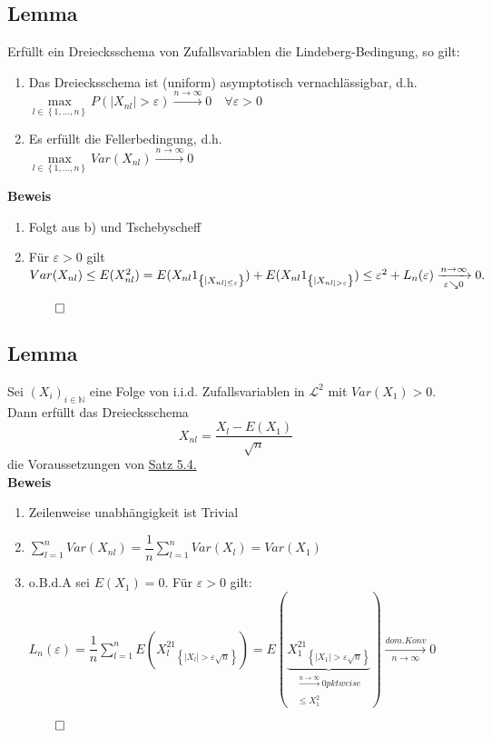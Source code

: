 \documentclass[german,10pt,oneside, fleqn, a4paper]{article}
\newcommand{\tscheb}{Tschebyscheff}
\newcommand {\N}	{\mathbb{N}}
\newcommand{\sm}[2][\infty]{\sum\limits_{#2}^{#1}}
\newcommand{\brc}[1]{\left(#1\right)}
\newcommand{\brac}[1]{\left\lbrace #1\right\rbrace}
\newcommand{\folge}[3][\N]{\left(#2_#3\right)_{#3\in #1}}
\newcommand{\QED}{\begin{flushright}$\qed$\end{flushright}}
\newcommand{\mc}[1]{\mathcal{#1}}
\newcommand{\lp}[1]{\mc{L}^{#1}}
\newcommand{\beweis}{\textbf{Beweis}\\}
\newcommand{\toinf}{\rightarrow\infty}
\newcommand{\1}[1]{1_{#1}}
\newcommand{\2}[1]{\1{\brac{#1}}}
\newcommand{\xr}[2][]{\xrightarrow[#1]{#2}}
\newcommand{\fe}{\forall\varepsilon>0}
\begin{document}
\subsection{Lemma}
\label{5.5}
Erfüllt ein Dreiecksschema von Zufallsvariablen die Lindeberg-Bedingung, so gilt:\begin{enumerate}[label=(\alph*)]
\item Das Dreiecksschema ist (uniform) asymptotisch vernachlässigbar, d.h.\\
$\max\limits_{l\in\brac{1,...,n}}P(|X_{nl}|>\varepsilon)\xr{n\toinf}0\quad \fe$
\item Es erfüllt die Fellerbedingung, d.h.\\
$\max\limits_{l\in\brac{1,...,n}}Var(X_{nl})\xr{n\toinf}0$	
\end{enumerate}
\beweis
\begin{enumerate}[label=(\alph*)]
\item Folgt aus b) und \tscheb
\item Für $\varepsilon>0$ gilt\\
$Var(X_{nl})\leq E(X_{nl}^2)=E(X_{nl}\1{\brac{|X_{nl]\leq\varepsilon}}})+E(X_{nl}\1{\brac{|X_{nl]>\varepsilon}}})\\
\leq \varepsilon^2+L_n(\varepsilon)\xr[\varepsilon\searrow0]{n\toinf}0.$\QED
\end{enumerate}

\subsection{Lemma}
\label{5.6}
Sei $\folge{X}{i}$ eine Folge von i.i.d. Zufallsvariablen in $\lp{2}$ mit $Var(X_1)>0$. Dann erfüllt das Dreiecksschema\\
\[X_{nl}=\dfrac{X_l-E(X_1)}{\sqrt{n}}\]
die Voraussetzungen von \hyperref[5.4]{Satz 5.4.}\\
\beweis
\begin{enumerate}[label=(\alph*)]
\item Zeilenweise unabhängigkeit ist Trivial
\item $\sm[n]{l=1}Var(X_{nl})=\dfrac{1}{n}\sm[n]{l=1}Var(X_l)=Var(X_1)$
\item o.B.d.A sei $E(X_1)=0$. Für $\varepsilon>0$ gilt:\\
$L_n(\varepsilon)=\dfrac{1}{n}\sm[n]{l=1}E\brc{X_l^2\1{\brac{|X_l|>\varepsilon\sqrt{n}}}}=E\brc{\underbrace{X_1^2\1{\brac{|X_1|>\varepsilon\sqrt{n}}}}_{\substack{\xr{n\toinf}0 pktweise\\ \leq X_1^2}}}\xr[n\toinf]{dom. Konv}0$\QED
\end{enumerate}
\end{document}
